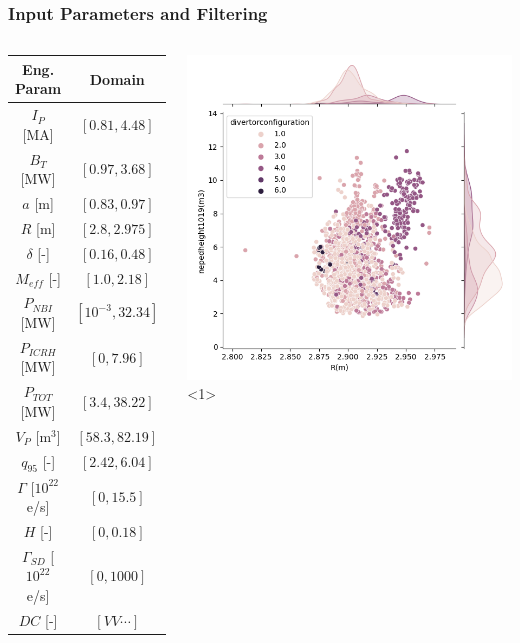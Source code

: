 \documentclass{beamer}
\begin{document}
\begin{frame}
\frametitle{Input Parameters and Filtering}
\begin{columns}


\begin{center}
\begin{tabular}{| c | c | }
	\hline
	Eng. Param & Domain \\
	\hline
	$I_P$ [MA] & $[0.81, 4.48]$ \\
	$B_T$ [MW] & $[0.97, 3.68]$ \\
	$a$ [m] & $[0.83, 0.97]$ \\
	$R$ [m] & $[2.8, 2.975]$ \\ 
	$\delta$ [-] & $[0.16, 0.48]$ \\
	$M_{eff}$ [-] & $[1.0, 2.18]$ \\
	$P_{NBI}$ [MW] & $[10^{-3}, 32.34]$ \\
	$P_{ICRH}$ [MW] & $[0, 7.96]$ \\
	$P_{TOT}$ [MW] & $[3.4, 38.22]$ \\
	$V_P$ [m$^3$] &  $[58.3, 82.19]$ \\
	$q_{95}$ [-] & $[2.42, 6.04]$ \\
	$\Gamma$ [$10^{22}$ e/s] & $[0, 15.5]$ \\
	$H$ [-] & $[0, 0.18]$ \\
	$\Gamma_{SD}$ [$10^{22}$ e/s] & $[0, 1000]$ \\
	$DC$ [-] & $[VV \cdots]$ \\
	\hline
\end{tabular}
	\end{center}
	\hfill
{}
\begin{center}
\includegraphics[scale=0.48]{../src/R_vs_NEPED_DC}<1>
\end{center}

\end{columns}
\end{frame}
\end{document}
